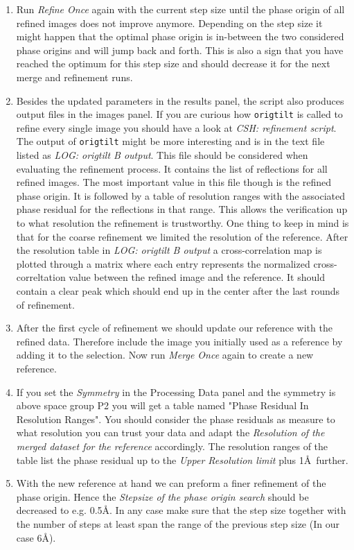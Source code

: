\begin{enumerate}
	\item Run \textit{Refine Once} again with the current step size until the phase origin of all refined images does not improve anymore. Depending on the step size it might happen that the optimal phase origin is in-between the two considered phase origins and will jump back and forth. This is also a sign that you have reached the optimum for this step size and should decrease it for the next merge and refinement runs.
	\item Besides the updated parameters in the results panel, the script also produces output files in the images panel. If you are curious how \texttt{origtilt} is called to refine every single image you should have a look at \textit{CSH: refinement script}. The output of \texttt{origtilt} might be more interesting and is in the text file listed as \textit{LOG: origtilt B output}. This file should be considered when evaluating the refinement process. It contains the list of reflections for all refined images. The most important value in this file though is the refined phase origin. It is followed by a table of resolution ranges with the associated phase residual for the reflections in that range. This allows the verification up to what resolution the refinement is trustworthy. One thing to keep in mind is that for the coarse refinement we limited the resolution of the reference. After the resolution table in \textit{LOG: origtilt B output} a cross-correlation map is plotted through a matrix where each entry represents the normalized cross-correltation value between the refined image and the reference. It should contain a clear peak which should end up in the center after the last rounds of refinement.
	\item After the first cycle of refinement we should update our reference with the refined data. Therefore include the image you initially used as a reference by adding it to the selection. Now run \textit{Merge Once} again to create a new reference. 
	\item If you set the \textit{Symmetry} in the Processing Data panel and the symmetry is above space group P2 you will get a table named "Phase Residual In Resolution Ranges". You should consider the phase residuals as measure to what resolution you can trust your data and adapt the \textit{Resolution of the merged dataset for the reference} accordingly. The resolution ranges of the table list the phase residual up to the \textit{Upper Resolution limit} plus 1\AA~further.
	\item With the new reference at hand we can preform a finer refinement of the phase origin. Hence the \textit{Stepsize of the phase origin search} should be decreased to e.g. 0.5\AA. In any case make sure that the step size together with the number of steps at least span the range of the previous step size (In our case 6\AA).

\end{enumerate}
